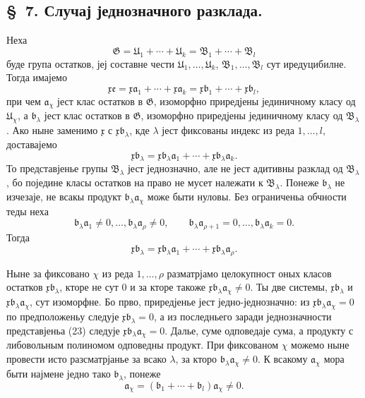﻿\documentclass[11pt]{article}
\providecommand{\mG}{\mathfrak G}
\providecommand{\mU}{\mathfrak U}
\providecommand{\mB}{\mathfrak B}
\providecommand{\ma}{\mathfrak a}
\providecommand{\mb}{\mathfrak b}
\providecommand{\me}{\mathfrak e}
\providecommand{\mx}{\mathfrak x}
\begin{document}

\setcounter{footnote}{15}
\subsection*{\S~7. Случај једнозначного разклада.}

Неха
\[
 \mG=\mU_1+\cdots+\mU_k=\mB_1+\cdots+\mB_l
\]
буде група остатков, јеј составне чести \(\mU_1,\ldots,\mU_k\), \(\mB_1,\ldots,\mB_l\) сут иредуцибилне. Тогда имајемо
\begin{equation}
 \mx\me=\mx\ma_1+\cdots+\mx\ma_k
 =\mx\mb_1+\cdots+\mx\mb_l,
\tag{22}
\end{equation}
при чем \(\ma_\chi\) јест клас остатков в \(\mG\), изоморфно приредјены јединичному класу од \(\mU_\chi\), а \(\mb_\lambda\) јест клас остатков в \(\mG\), изоморфно приредјены јединичному класу од \(\mB_\lambda\). Ако ныне заменимо \(\mx\) с \(\mx\mb_\lambda\), кде \(\lambda\) јест фиксованы индекс из реда \(1,\ldots,l\), доставајемо
\begin{equation}
 \mx\mb_\lambda=\mx\mb_\lambda\ma_1+\cdots+\mx\mb_\lambda\ma_k.
\tag{23}
\end{equation}
То представјенье групы \(\mB_\lambda\) јест једнозначно, але не јест адитивны разклад од \(\mB_\lambda\), бо поједине класы остатков на право не мусет належати к \(\mB_\lambda\). Понеже \(\mb_\lambda\) не изчезаје, не всакы продукт \(\mb_\lambda\ma_\chi\) може быти нуловы. Без ограниченьа обчности теды неха
\[
 \mb_\lambda\ma_1\ne0,
 \ldots,
 \mb_\lambda\ma_\rho\ne0,
 \qquad
 \mb_\lambda\ma_{\rho+1}=0,
 \ldots,
 \mb_\lambda\ma_k=0.
\]
Тогда
\[
 \mx\mb_\lambda=\mx\mb_\lambda\ma_1+\cdots+\mx\mb_\lambda\ma_\rho.
\]

Ныне за фиксовано \(\chi\) из реда \(1,\ldots,\rho\) разматрјамо целокупност оных класов остатков \(\mx\mb_\lambda\), кторе не сут \(0\) и за кторе такоже \(\mx\mb_\lambda\ma_\chi\ne0\). Ты две системы, \(\mx\mb_\lambda\) и \(\mx\mb_\lambda\ma_\chi\), сут изоморфне. Бо прво, приредјенье јест једно-једнозначно: из \(\mx\mb_\lambda\ma_\chi=0\) по предположеньу следује \(\mx\mb_\lambda=0\), а из последньего заради једнозначности представјеньа (23) следује \(\mx\mb_\lambda\ma_\chi=0\). Далье, суме одповедаје сума, а продукту с либовольным полиномом одповедны продукт. При фиксованом \(\chi\) можемо ныне провести исто разсматрјанье за всако \(\lambda\), за кторо \(\mb_\lambda\ma_\chi\ne0\). К всакому \(\ma_\chi\) мора быти најмене једно тако \(\mb_\lambda\), понеже
\[
 \ma_\chi=(\mb_1+\cdots+\mb_l)\ma_\chi\ne0.
\]
\end{document}
